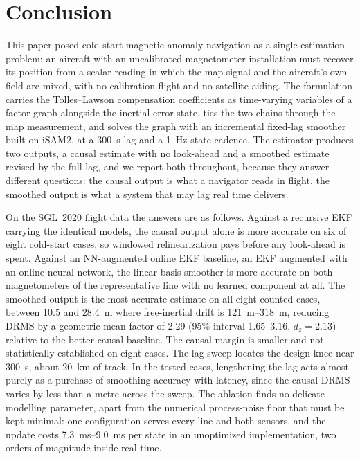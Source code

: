 \documentclass{IEEEtaes}
\begin{document}
\section{Conclusion}\label{sec:conclusion}
This paper posed cold-start magnetic-anomaly navigation as a single estimation
problem: an aircraft with an uncalibrated magnetometer installation must
recover its position from a scalar reading in which the map signal and the
aircraft's own field are mixed, with no calibration flight and no satellite
aiding. The formulation carries the Tolles--Lawson compensation coefficients as
time-varying variables of a factor graph alongside the inertial error state,
ties the two chains through the map measurement, and solves the graph with an
incremental fixed-lag smoother built on iSAM2, at a \SI{300}{\second} lag and a
\SI{1}{\hertz} state cadence. The estimator produces two outputs, a causal
estimate with no look-ahead and a smoothed estimate revised by the full lag,
and we report both throughout, because they answer different questions: the
causal output is what a navigator reads in flight, the smoothed output is what
a system that may lag real time delivers.

On the SGL~2020 flight data the answers are as follows. Against a recursive EKF
carrying the identical models, the causal output alone is more accurate on six
of eight cold-start cases, so windowed relinearization pays before any
look-ahead is spent. Against an NN-augmented online EKF baseline, an EKF
augmented with an online neural network, the linear-basis smoother is more
accurate on both magnetometers of the representative line with no learned
component at all. The smoothed output is the most accurate estimate on all
eight counted cases, between \SI{10.5}{} and \SI{28.4}{\meter} where
free-inertial drift is \SIrange{121}{318}{\meter}, reducing DRMS by a
geometric-mean factor of \num{2.29} (95\% interval \numrange{1.65}{3.16},
$d_z=2.13$) relative to the better causal baseline. The causal margin is
smaller and not statistically established on eight cases. The lag sweep locates the design knee
near \SI{300}{\second}, about \SI{20}{\kilo\meter} of track. In the tested
cases, lengthening the lag acts almost purely as a purchase of smoothing
accuracy with latency, since the causal DRMS varies by less than a metre
across the sweep. The ablation finds no delicate modelling
parameter, apart from the numerical process-noise floor that must be kept
minimal: one configuration serves every line and both sensors, and the update
costs \SIrange{7.3}{9.0}{\milli\second} per state in an unoptimized
implementation, two orders of magnitude inside real time.
\end{document}
